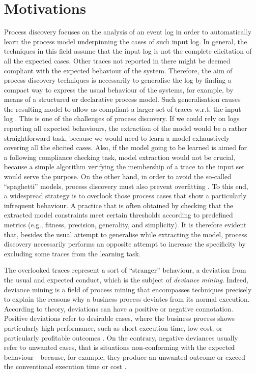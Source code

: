 
\section{Motivations}
\label{sec:motivations}
Process discovery focuses on the analysis of an event log in order to automatically learn the process model underpinning the cases of such input log. 
In general, the techniques in this field assume that the input log is not the complete elicitation of all the expected cases. Other traces not reported in there might be deemed compliant with the expected behaviour of the system. Therefore, the aim of process discovery techniques is necessarily to generalise the log by finding a compact way to express the usual behaviour of the systems, for example, by means of a structured or declarative process model. 
Such generalisation causes the resulting model to allow as compliant a larger set of traces w.r.t. the input log \cite{2011-Aalst}. This is one of the challenges of process discovery. If we could rely on logs reporting all expected behaviours, the extraction of the model would be a rather straightforward task, because we would need to learn a model exhaustively covering all the elicited cases. Also, if the model going to be learned is aimed for a following compliance checking task, model extraction would not be crucial, because a simple algorithm verifying the membership of a trace to the input set would serve the purpose.
On the other hand, in order to avoid the so-called ``spaghetti'' models, process discovery must also prevent overfitting \cite{2010-Aalst}. To this end, a widespread strategy is to overlook those process cases that show a particularly infrequent behaviour. A practice that is often obtained by checking that the extracted model constraints meet certain thresholds according to predefined metrics (e.g., fitness, precision, generality, and simplicity). 
It is therefore evident that, besides the usual attempt to generalise while extracting the model, process discovery necessarily performs an opposite attempt to increase the specificity by excluding some traces from the learning task.

The overlooked traces represent a sort of ``stranger'' behaviour, a deviation from the usual and expected conduct, which is the subject of \emph{deviance mining}\cite{2016-Nguyen}. 
%
Indeed, deviance mining is a field of process mining that encompasses techniques precisely to explain the reasons why a business process deviates from its normal execution. 
According to theory, deviations can have a positive or negative connotation. Positive deviations refer to desirable cases, where the business process shows particularly high performance, such as short execution time, low  cost, or particularly profitable outcomes \cite{2004-Spreitzer}. On the contrary, negative deviances usually refer to unwanted cases, that is situations non-conforming with the expected behaviour---because, for example, they produce an unwanted outcome or exceed the conventional execution time or cost \cite{2016-Nguyen}.
 
